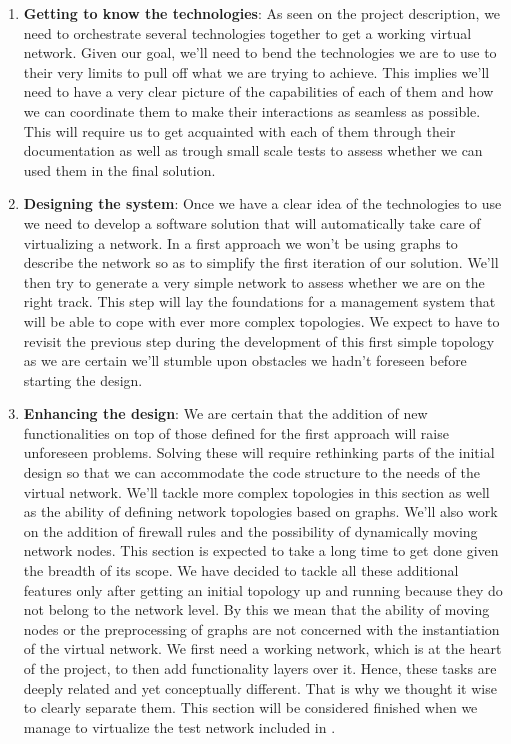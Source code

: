 \documentclass[12pt]{article}
\begin{document}
        \begin{enumerate}
            \item \textbf{Getting to know the technologies}: As seen on the project description, we need to orchestrate several technologies together to get a working virtual network. Given our goal, we'll need to bend the technologies we are to use to their very limits to pull off what we are trying to achieve. This implies we'll need to have a very clear picture of the capabilities of each of them and how we can coordinate them to make their interactions as seamless as possible. This will require us to get acquainted with each of them through their documentation as well as trough small scale tests to assess whether we can used them in the final solution.

            \item \textbf{Designing the system}: Once we have a clear idea of the technologies to use we need to develop a software solution that will automatically take care of virtualizing a network. In a first approach we won't be using graphs to describe the network so as to simplify the first iteration of our solution. We'll then try to generate a very simple network to assess whether we are on the right track. This step will lay the foundations for a management system that will be able to cope with ever more complex topologies. We expect to have to revisit the previous step during the development of this first simple topology as we are certain we'll stumble upon obstacles we hadn't foreseen before starting the design.

            \item \textbf{Enhancing the design}: We are certain that the addition of new functionalities on top of those defined for the first approach will raise unforeseen problems. Solving these will require rethinking parts of the initial design so that we can accommodate the code structure to the needs of the virtual network. We'll tackle more complex topologies in this section as well as the ability of defining network topologies based on graphs. We'll also work on the addition of firewall rules and the possibility of dynamically moving network nodes. This section is expected to take a long time to get done given the breadth of its scope. We have decided to tackle all these additional features only after getting an initial topology up and running because they do not belong to the network level. By this we mean that the ability of moving nodes or the preprocessing of graphs are not concerned with the instantiation of the virtual network. We first need a working network, which is at the heart of the project, to then add functionality layers over it. Hence, these tasks are deeply related and yet conceptually different. That is why we thought it wise to clearly separate them. This section will be considered finished when we manage to virtualize the test network included in \cite{bib:ICS}.


\end{enumerate}
\end{document}
